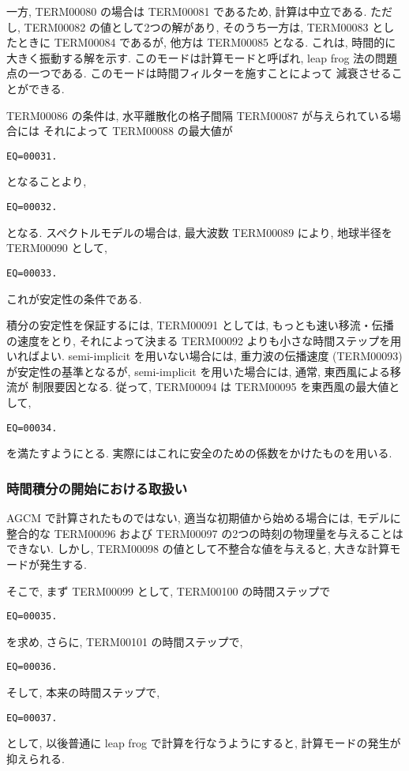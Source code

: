 一方, TERM00080 の場合は TERM00081 であるため,
計算は中立である.
ただし, TERM00082 の値として2つの解があり,
そのうち一方は, TERM00083 としたときに
TERM00084 であるが, 
他方は TERM00085 となる.
これは, 時間的に大きく振動する解を示す.
このモードは計算モードと呼ばれ, 
leap frog 法の問題点の一つである.
このモードは時間フィルターを施すことによって
減衰させることができる.

TERM00086 の条件は,
水平離散化の格子間隔 TERM00087 が与えられている場合には
それによって TERM00088 の最大値が
\begin{verbatim}
EQ=00031.
\end{verbatim}
となることより,
\begin{verbatim}
EQ=00032.
\end{verbatim}
となる.
スペクトルモデルの場合は, 最大波数 TERM00089 により,
地球半径を TERM00090 として,
\begin{verbatim}
EQ=00033.
\end{verbatim}
これが安定性の条件である.

積分の安定性を保証するには,
TERM00091 としては, もっとも速い移流・伝播の速度をとり,
それによって決まる TERM00092 よりも小さな時間ステップを用いればよい.
semi-implicit を用いない場合には, 重力波の伝播速度
(TERM00093) が安定性の基準となるが,
semi-implicit を用いた場合には, 通常, 東西風による移流が
制限要因となる.
従って, TERM00094 は TERM00095 を東西風の最大値として,
\begin{verbatim}
EQ=00034.
\end{verbatim}
を満たすようにとる.
実際にはこれに安全のための係数をかけたものを用いる.

\subsubsection{時間積分の開始における取扱い}

AGCM で計算されたものではない, 
適当な初期値から始める場合には, モデルに整合的な
TERM00096 および TERM00097 の2つの時刻の物理量を与えることはできない.
しかし, TERM00098 の値として不整合な値を与えると,
大きな計算モードが発生する.

そこで, まず TERM00099 として, TERM00100 の時間ステップで
\begin{verbatim}
EQ=00035.
\end{verbatim}
を求め, さらに, TERM00101 の時間ステップで,
\begin{verbatim}
EQ=00036.
\end{verbatim}
そして, 本来の時間ステップで,
\begin{verbatim}
EQ=00037.
\end{verbatim}
として, 以後普通に leap frog で計算を行なうようにすると,
計算モードの発生が抑えられる.
